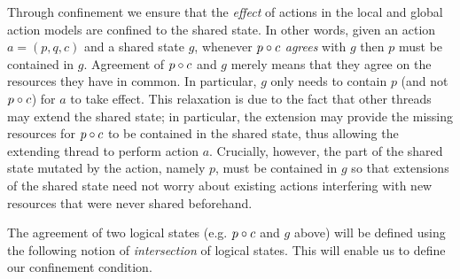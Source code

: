 Through confinement we ensure that the \emph{effect} of actions in the local and global action models are confined to the shared state. In other words, given an action $a = (p, q, c)$ and a shared state $g$, whenever $p \circ c$ \emph{agrees} with $g$ then $p$ must be contained in $g$. 
Agreement of $p \circ c$ and $g$ merely means that they agree on the resources they have in common. 
In particular, $g$ only needs to contain $p$ (and not $p \circ c$) for $a$ to take effect. This relaxation is due to the fact that other threads may extend the shared state; in particular, the extension may provide the missing resources for $p \circ c$ to be contained in the shared state, thus allowing the extending thread to perform action $a$. 
Crucially, however, the part of the shared state mutated by the action, namely $p$, must be contained in $g$ so that extensions of the shared state need not worry about existing actions interfering with new resources that were never shared beforehand. 

The agreement of two logical states (e.g. $p \circ c$ and $g$ above) will be defined using the following notion of \emph{intersection} of logical states. This will enable us to define our confinement condition.


